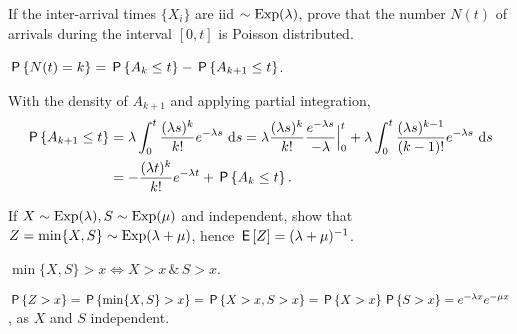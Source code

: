 \begin{exercise}\label{ex:l-213}
 If 
 the inter-arrival times $\{X_i\}$ are iid
 $\sim \Exp(\lambda)$, prove that the number $N(t)$ of arrivals during the interval $[0,t]$ is Poisson distributed.
\begin{hint}
 $\P{N(t)=k} = \P{A_k \leq t} - \P{A_{k+1} \leq t}$.
\end{hint}
\begin{solution}
With  the density of $A_{k+1}$ and applying partial integration,
\begin{align*}
\P{A_{k+1} \leq t}
&= \lambda \int_0^t \frac{(\lambda s)^{k}}{k!}e^{-\lambda s}\, \d s
= \lambda \frac{(\lambda s)^{k}}{k!}\frac{e^{-\lambda s}}{-\lambda} \Big|_{0}^t + \lambda \int_0^t \frac{(\lambda s)^{k-1}}{(k-1)!}e^{-\lambda s}\, \d s \\
&= - \frac{(\lambda t)^{k}}{k!} e^{-\lambda t} + \P{A_k \leq t}.
\end{align*}
\end{solution}
\end{exercise}



\begin{exercise}\label{ex:10}
 If  $X\sim\Exp(\lambda), S\sim\Exp(\mu)$ and
 independent, show that $Z=\min\{X,S\}\sim\Exp(\lambda+\mu)$,
hence $\E Z = (\lambda+\mu)^{-1}$.
\begin{hint}
$\min\{X, S\}>x \iff X>x \, \& \, S> x$.
\end{hint}
\begin{solution}
$\P{Z>x} = \P{\min\{X,S\}>x} = \P{X>x, S> x} = \P{X>x}\P{S>x}  = e^{-\lambda x} e^{-\mu x}$, as  $X$ and $S$ independent.
\end{solution}
\end{exercise}

